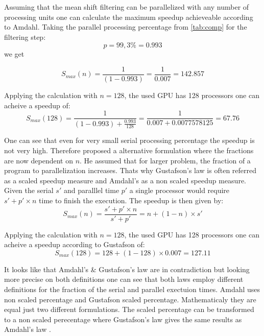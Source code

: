 Assuming that the mean shift filtering can be parallelized with any number of
processing units one can calculate the maximum speedup achieveable according
to Amdahl. Taking the parallel processing percentage from \autoref{tab:comp} for 
the filtering step: 
\begin{equation*}\label{eq:parallel}
	p = 99,3\% = 0.993 
\end{equation*}
we get

\begin{equation*}\label{eq:am0}
	S_{max}(n) = \frac{1}{(1-0.993)} = \frac{1}{0.007} = 142.857	
\end{equation*}

Applying the calculation with $n = 128$, the used \gls{GPU} has 128 processors one
can acheive a speedup of:
\begin{equation*}\label{eq:g92sp}
		S_{max}(128) = \frac{1}{(1-0.993) + \frac{0.993}{128}} = \frac{1}{0.007 + 0.0077578125} = 67.76
\end{equation*}

One can see that even for very small serial processing percentage the speedup is
not very high. Therefore \citeauthor{citeulike:3732921} proposed a alternative
formulation where the fractions are now dependent on $n$. He assumed that for 
larger problem, the fraction of a program to parallelization increases. Thats
why Gustafson's law is often referred as a scaled speedup measure
and Amdahl's as a non scaled speedup measure. Given the serial $s'$ and paralllel 
time $p'$ a single processor would require $s' + p' \times n$ time to finish the execution.
The speedup is then given by:
\begin{equation}\label{eq:gus}
	S_{max}(n) = \frac{s' + p' \times n}{s' + p'} = n + ( 1 - n ) \times s'
\end{equation}

Applying the calculation with $n = 128$, the used \gls{GPU} has 128 processors one
can acheive a speedup according to Gustafson of:
\begin{equation*}\label{eq:g92sp}
		S_{max}(128) = 128 + (1 - 128) \times 0.007 = 127.11
\end{equation*}


It looks like that Amdahl's \& Gustafson's law are in contradiction but looking
more precise on both definitions one can see that both laws employ different
definitions for the fraction of the serial and parallel exectuion times. Amdahl
uses non scaled percentage and Gustafson scaled percentage. Mathematicaly they
are equal just two different formulations. The scaled percentage can be
transformed to a non scaled perecentage where Gustafson's law gives the same
results as Amdahl's law \citep{citeulike:3838998}.

